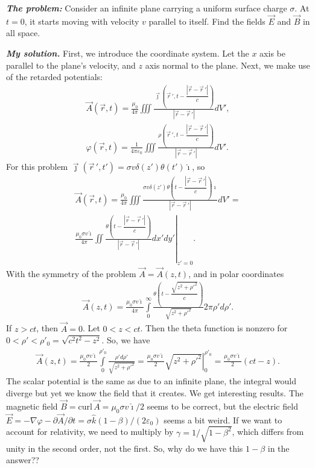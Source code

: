 \documentclass[10pt,a4paper,pdflatex]{disser}
\begin{document}
\textit{\textbf{The problem:}} Consider an infinite plane carrying a uniform surface charge $\sigma$. At $t=0$, it starts moving with velocity $v$ parallel to itself. Find the fields $\vec{E}$ and $\vec{B}$ in all space.

\textit{\textbf{My solution.}} First, we introduce the coordinate system. Let the $x$ axis be parallel to the plane's velocity, and $z$ axis normal to the plane. Next, we make use of the retarded potentials:
\begin{gather*}
 \vec{A}\left(\vec{r},t\right)=\frac{\mu_0}{4\pi}\iiint \frac{\vec{\jmath}\left(\vec{r}\,',t-\dfrac{|\vec{r}-\vec{r}\,'|}{c}\right)}{|\vec{r}-\vec{r}\,'|}dV',\\
 \varphi\left(\vec{r},t\right)=\frac{1}{4\pi\varepsilon_0}\iiint \frac{\rho\left(\vec{r}\,',t-\dfrac{|\vec{r}-\vec{r}\,'|}{c}\right)}{|\vec{r}-\vec{r}\,'|}dV'.
\end{gather*}
For this problem $\vec{\jmath}\left(\vec{r}\,',t'\right)=\sigma v\delta(z')\theta(t')\hat{\imath}$, so
\begin{gather*}
 \vec{A}\left(\vec{r},t\right)=\frac{\mu_0}{4\pi}\iiint \frac{\sigma v\delta(z')\theta\left(t-\dfrac{|\vec{r}-\vec{r}\,'|}{c}\right)\hat{\imath}}{|\vec{r}-\vec{r}\,'|}dV'=\\\frac{\mu_0 \sigma v \hat{\imath}}{4\pi}\iint \left.\frac{\theta\left(t-\dfrac{|\vec{r}-\vec{r}\,'|}{c}\right)}{|\vec{r}-\vec{r}\,'|}dx' dy'\right|_{z'=0}.
\end{gather*}
With the symmetry of the problem $\vec{A}=\vec{A}(z,t)$, and in polar coordinates
\begin{gather*}
 \vec{A}(z,t)=\frac{\mu_0 \sigma v \hat{\imath}}{4\pi}\int\limits_0^\infty \frac{\theta\left(t-\dfrac{\sqrt{z^2+\rho'^2}}{c}\right)}{\sqrt{z^2+\rho'^2}}2\pi \rho' d\rho'.
\end{gather*}
If $z>ct$, then $\vec{A}=0$. Let $0<z<ct$. Then the theta function is nonzero for $0<\rho'<\rho'_0=\sqrt{c^2 t^2-z^2}$. So, we have
\begin{gather*}
 \vec{A}(z,t)=\frac{\mu_0 \sigma v \hat{\imath}}{2}\int\limits_0^{\rho'_0} \frac{\rho' d\rho'}{\sqrt{z^2+\rho'^2}}=\frac{\mu_0 \sigma v \hat{\imath}}{2}\left.\sqrt{z^2+\rho'^2}\right|_{0}^{\rho'_0}=\frac{\mu_0 \sigma v \hat{\imath}}{2}(ct-z).
\end{gather*}
The scalar potential is the same as due to an infinite plane, the integral would diverge but yet we know the field that it creates. We get interesting results. The magnetic field $\vec{B}=\text{curl}\, \vec{A}=\mu_0 \sigma v \hat{\imath}/2$ seems to be correct, but the electric field $\vec{E}=-\nabla\varphi-\partial \vec{A}/\partial t=\sigma \hat{k}(1-\beta)/(2\varepsilon_0)$ seems a bit weird. If we want to account for relativity, we need to multiply by $\gamma=1/\sqrt{1-\beta^2}$, which differs from unity in the second order, not the first. So, why do we have this $1-\beta$ in the answer??
\end{document}
